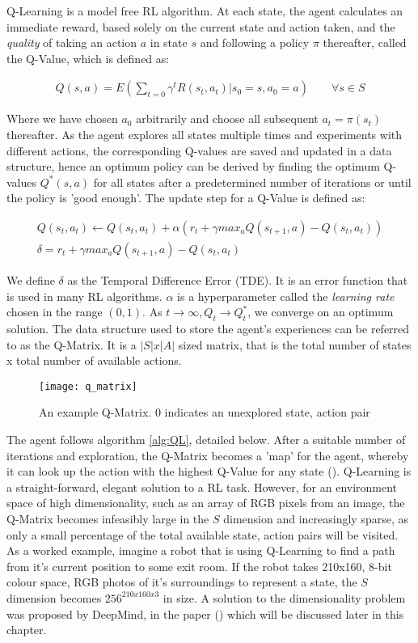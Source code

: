 Q-Learning is a model free RL algorithm. At each state, the agent calculates an immediate reward,
based solely on the current state and action taken, and the \textit{quality} of taking an action $a$
in state $s$ and following a policy $\pi$ thereafter, called the Q-Value, which is defined as:

\begin{align}
    \label{equ:Q}
    Q(s, a) = E(\sum_{t=0}\gamma^tR(s_t, a_t) | s_0 = s, a_0 = a) \qquad \forall s \in S
\end{align}

Where we have chosen $a_0$ arbitrarily and
choose all subsequent $a_t = \pi(s_t)$ thereafter. As the agent explores all states multiple times
and experiments with different actions, the corresponding Q-values are saved and updated in a data
structure, hence an optimum policy can be derived by finding the optimum Q-values $Q^*(s, a)$ for all states after a predetermined number of iterations or until the policy is 'good enough'. The update step for a Q-Value is defined as:

\begin{gather}
    \label{equ:QUpdate}
    Q(s_t, a_t) \leftarrow Q(s_t, a_t) + \alpha(r_t + \gamma max_aQ(s_{t+1}, a) - Q(s_t, a_t)) \\
    \label{equ:TDE}
    \delta = r_t + \gamma max_aQ(s_{t+1}, a) - Q(s_t, a_t)
\end{gather}

We define $\delta$ as the Temporal Difference Error (TDE). It is an error function that is used in many RL algorithms. $\alpha$ is a hyperparameter called the \textit{learning rate} chosen in the range $(0, 1)$. As $t \rightarrow \infty, Q_t \rightarrow Q^*_t$, we converge on an optimum solution. The data structure used to store the agent's experiences can be referred to as the Q-Matrix. It is a $|S| x |A|$ sized matrix, that is the total number of states x total number of available actions.

\begin{figure}[h]
    \texttt{[image: q\_matrix]}
    \centering
    \caption{An example Q-Matrix. 0 indicates an unexplored state, action pair}
\end{figure}

The agent follows algorithm \ref{alg:QL}, detailed below.
After a suitable number of iterations and exploration, the Q-Matrix becomes a 'map' for the agent,
whereby it can look up the action with the highest Q-Value for any state (\cite{qlearning}).
Q-Learning is a straight-forward, elegant solution to a RL task. However, for an environment space
of high dimensionality, such as an array of RGB pixels from an image, the Q-Matrix becomes
infeasibly large in the $S$ dimension and increasingly sparse, as only a small percentage of the
total available state, action pairs will be visited. As a worked example, imagine a robot that is
using Q-Learning to find a path from it's current position to some exit room. If the robot takes
210x160, 8-bit colour space, RGB photos of it's surroundings to represent a state, the $S$ dimension
becomes $256^{210x160x3}$ in size. A solution to the dimensionality problem was
proposed by DeepMind, in the paper (\cite{deepmind1}) which will be discussed later in this chapter.

